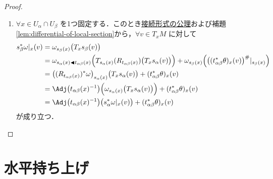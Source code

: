 \documentclass[geometry_main]{subfiles}
\begin{document}
\begin{proof}
\begin{enumerate}
        \item $\forall x \in U_\alpha \cap U_\beta$ を1つ固定する．このとき\hyperref[def:connection]{接続形式の公理}および補題\ref{lem:differential-of-local-section}から，$\forall v \in T_x M$ に対して
        \begin{align}
            s_\beta^* \omega|_x (v) 
            &= \omega_{s_\beta(x)} \bigl( T_x s_\beta (v) \bigr) \\
            &= \omega_{s_\alpha(x) \btl t_{\alpha\beta}(x)} \Bigl( T_{s_\alpha(x)} (R_{t_{\alpha\beta}(x)}) \bigl( T_x s_\alpha(v) \bigr)\Bigr) + \omega_{s_\beta(x)}\Bigl( \bigl( (t_{\alpha\beta}^* \theta)_x (v) \bigr)^\#|_{s_\beta(x)} \Bigr) \\
            &= \bigl((R_{t_{\alpha\beta}(x)})^* \omega\bigr)_{s_\alpha(x)} \bigl( T_x s_\alpha(v) \bigr) + (t_{\alpha\beta}^* \theta)_x (v) \\
            &= \Adj \bigl( t_{\alpha\beta}(x)^{-1} \bigr) \Bigl( \omega_{s_\alpha(x)} \bigl( T_x s_\alpha (v) \bigr) \Bigr)  + (t_{\alpha\beta}^* \theta)_x (v) \\
            &= \Adj \bigl( t_{\alpha\beta}(x)^{-1} \bigr) \bigl( s_\alpha^* \omega|_x (v) \bigr)  + (t_{\alpha\beta}^* \theta)_x (v)
        \end{align}
        が成り立つ．
    \end{enumerate}
\end{proof}




\section{水平持ち上げ}
\end{document}
